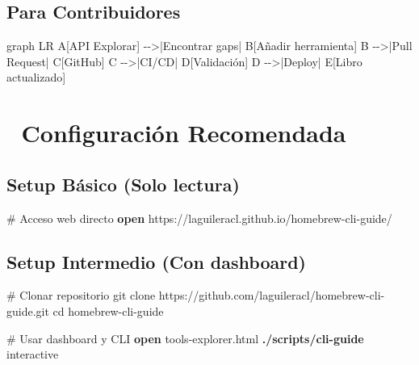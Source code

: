 \documentclass[
  11pt,
  letterpaper,
  oneside,
  openany]{scrbook}
\newenvironment{Shaded}{}{}
\newcommand{\BuiltInTok}[1]{\textcolor[rgb]{0.84,0.23,0.29}{#1}}
\newcommand{\CommentTok}[1]{\textcolor[rgb]{0.42,0.45,0.49}{#1}}
\newcommand{\ExtensionTok}[1]{\textcolor[rgb]{0.84,0.23,0.29}{\textbf{#1}}}
\newcommand{\FunctionTok}[1]{\textcolor[rgb]{0.44,0.26,0.76}{#1}}
\newcommand{\NormalTok}[1]{\textcolor[rgb]{0.14,0.16,0.18}{#1}}
\begin{document}
\subsection{Para Contribuidores}\label{para-contribuidores}

\begin{Shaded}
\begin{Highlighting}[]
\NormalTok{graph LR}
\NormalTok{    A[API Explorar] {-}{-}\textgreater{}|Encontrar gaps| B[Añadir herramienta]}
\NormalTok{    B {-}{-}\textgreater{}|Pull Request| C[GitHub]}
\NormalTok{    C {-}{-}\textgreater{}|CI/CD| D[Validación]}
\NormalTok{    D {-}{-}\textgreater{}|Deploy| E[Libro actualizado]}
\end{Highlighting}
\end{Shaded}

\section{🎯 Configuración
Recomendada}\label{configuraciuxf3n-recomendada}

\subsection{Setup Básico (Solo
lectura)}\label{setup-buxe1sico-solo-lectura}

\begin{Shaded}
\begin{Highlighting}[]
\CommentTok{\# Acceso web directo}
\ExtensionTok{open}\NormalTok{ https://laguileracl.github.io/homebrew{-}cli{-}guide/}
\end{Highlighting}
\end{Shaded}

\subsection{Setup Intermedio (Con
dashboard)}\label{setup-intermedio-con-dashboard}

\begin{Shaded}
\begin{Highlighting}[]
\CommentTok{\# Clonar repositorio}
\FunctionTok{git}\NormalTok{ clone https://github.com/laguileracl/homebrew{-}cli{-}guide.git}
\BuiltInTok{cd}\NormalTok{ homebrew{-}cli{-}guide}

\CommentTok{\# Usar dashboard y CLI}
\ExtensionTok{open}\NormalTok{ tools{-}explorer.html}
\ExtensionTok{./scripts/cli{-}guide}\NormalTok{ interactive}
\end{Highlighting}
\end{Shaded}
\end{document}
